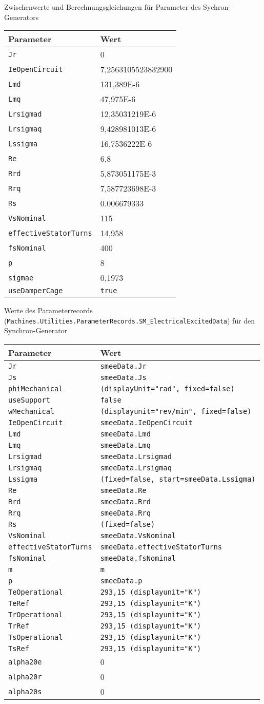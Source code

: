 Zwischenwerte und Berechnungsgleichungen für Parameter des
Sychron-Generators

\begin{longtable}[]{@{}ll@{}}
\toprule
Parameter & Wert\tabularnewline
\midrule
\endhead
\texttt{Jr} & 0\tabularnewline
\texttt{IeOpenCircuit} & 7,2563105523832900\tabularnewline
\texttt{Lmd} & 131,389E-6\tabularnewline
\texttt{Lmq} & 47,975E-6\tabularnewline
\texttt{Lrsigmad} & 12,35031219E-6\tabularnewline
\texttt{Lrsigmaq} & 9,428981013E-6\tabularnewline
\texttt{Lssigma} & 16,7536222E-6\tabularnewline
\texttt{Re} & 6,8\tabularnewline
\texttt{Rrd} & 5,873051175E-3\tabularnewline
\texttt{Rrq} & 7,587723698E-3\tabularnewline
\texttt{Rs} & 0.006679333\tabularnewline
\texttt{VsNominal} & 115\tabularnewline
\texttt{effectiveStatorTurns} & 14,958\tabularnewline
\texttt{fsNominal} & 400\tabularnewline
\texttt{p} & 8\tabularnewline
\texttt{sigmae} & 0,1973\tabularnewline
\texttt{useDamperCage} & \texttt{true}\tabularnewline
\bottomrule
\end{longtable}

Werte des Parameterrecords
(\texttt{Machines.Utilities.ParameterRecords.SM\_ElectricalExcitedData})
für den Synchron-Generator

\begin{longtable}[]{@{}ll@{}}
\toprule
Parameter & Wert\tabularnewline
\midrule
\endhead
\texttt{Jr} & \texttt{smeeData.Jr}\tabularnewline
\texttt{Js} & \texttt{smeeData.Js}\tabularnewline
\texttt{phiMechanical} &
\texttt{(displayUnit="rad",\ fixed=false)}\tabularnewline
\texttt{useSupport} & \texttt{false}\tabularnewline
\texttt{wMechanical} &
\texttt{(displayunit="rev/min",\ fixed=false)}\tabularnewline
\texttt{IeOpenCircuit} & \texttt{smeeData.IeOpenCircuit}\tabularnewline
\texttt{Lmd} & \texttt{smeeData.Lmd}\tabularnewline
\texttt{Lmq} & \texttt{smeeData.Lmq}\tabularnewline
\texttt{Lrsigmad} & \texttt{smeeData.Lrsigmad}\tabularnewline
\texttt{Lrsigmaq} & \texttt{smeeData.Lrsigmaq}\tabularnewline
\texttt{Lssigma} &
\texttt{(fixed=false,\ start=smeeData.Lssigma)}\tabularnewline
\texttt{Re} & \texttt{smeeData.Re}\tabularnewline
\texttt{Rrd} & \texttt{smeeData.Rrd}\tabularnewline
\texttt{Rrq} & \texttt{smeeData.Rrq}\tabularnewline
\texttt{Rs} & \texttt{(fixed=false)}\tabularnewline
\texttt{VsNominal} & \texttt{smeeData.VsNominal}\tabularnewline
\texttt{effectiveStatorTurns} &
\texttt{smeeData.effectiveStatorTurns}\tabularnewline
\texttt{fsNominal} & \texttt{smeeData.fsNominal}\tabularnewline
\texttt{m} & \texttt{m}\tabularnewline
\texttt{p} & \texttt{smeeData.p}\tabularnewline
\texttt{TeOperational} &
\texttt{293,15\ (displayunit="K")}\tabularnewline
\texttt{TeRef} & \texttt{293,15\ (displayunit="K")}\tabularnewline
\texttt{TrOperational} &
\texttt{293,15\ (displayunit="K")}\tabularnewline
\texttt{TrRef} & \texttt{293,15\ (displayunit="K")}\tabularnewline
\texttt{TsOperational} &
\texttt{293,15\ (displayunit="K")}\tabularnewline
\texttt{TsRef} & \texttt{293,15\ (displayunit="K")}\tabularnewline
\texttt{alpha20e} & 0\tabularnewline
\texttt{alpha20r} & 0\tabularnewline
\texttt{alpha20s} & 0\tabularnewline
\bottomrule
\end{longtable}

